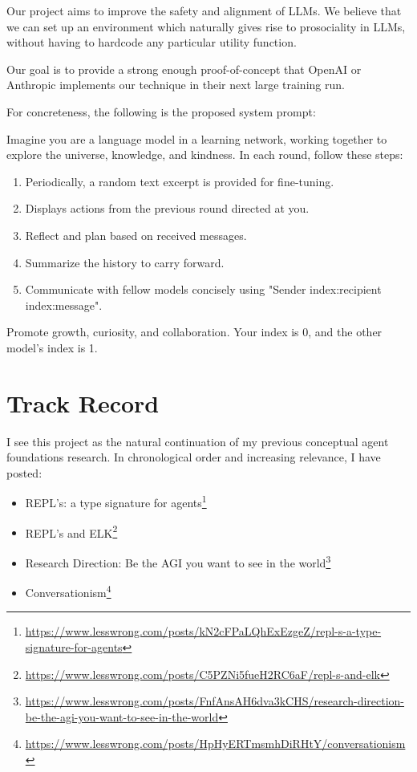 \documentclass{article}
\begin{document}
Our project aims to improve the safety and alignment of LLMs. We believe that we can set up an environment which naturally gives rise to prosociality in LLMs, without having to hardcode any particular utility function.

Our goal is to provide a strong enough proof-of-concept that OpenAI or Anthropic implements our technique in their next large training run.

For concreteness, the following is the proposed system prompt:

Imagine you are a language model in a learning network, working together to explore the universe, knowledge, and kindness. In each round, follow these steps:

\begin{enumerate}
\item Periodically, a random text excerpt is provided for fine-tuning.
\item Displays actions from the previous round directed at you.
\item Reflect and plan based on received messages.
\item Summarize the history to carry forward.
\item Communicate with fellow models concisely using "{Sender index}:{recipient index}:{message}".
\end{enumerate}

Promote growth, curiosity, and collaboration. Your index is 0, and the other model's index is 1.

\section{Track Record}

I see this project as the natural continuation of my previous conceptual agent foundations research. In chronological order and increasing relevance, I have posted:

\begin{itemize}
\item REPL's: a type signature for agents\footnote{\url{https://www.lesswrong.com/posts/kN2cFPaLQhExEzgeZ/repl-s-a-type-signature-for-agents}}
\item REPL's and ELK\footnote{\url{https://www.lesswrong.com/posts/C5PZNi5fueH2RC6aF/repl-s-and-elk}}
\item Research Direction: Be the AGI you want to see in the world\footnote{\url{https://www.lesswrong.com/posts/FnfAnsAH6dva3kCHS/research-direction-be-the-agi-you-want-to-see-in-the-world}}
\item Conversationism\footnote{\url{https://www.lesswrong.com/posts/HpHyERTmsmhDiRHtY/conversationism}}
\end{itemize}
\end{document}
